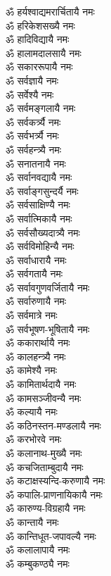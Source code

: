 \begin{multicols}{2}
\begin{flushleft}
ॐ हर्यश्वाद्यमरार्चितायै नमः\\
ॐ हरिकेशसख्यै नमः\\
ॐ हादिविद्यायै नमः\\
ॐ हालामदालसायै नमः\hfill {}\\
ॐ सकाररूपायै नमः\\
ॐ सर्वज्ञायै नमः\\
ॐ सर्वेश्यै नमः\\
ॐ सर्वमङ्गलायै नमः\\
ॐ सर्वकर्त्र्यै नमः\\
ॐ सर्वभर्त्र्यै नमः\\
ॐ सर्वहन्त्र्यै नमः\\
ॐ सनातनायै नमः\\
ॐ सर्वानवद्यायै नमः\\
ॐ सर्वाङ्गसुन्दर्यै नमः\hfill {}\\
ॐ सर्वसाक्षिण्यै नमः\\
ॐ सर्वात्मिकायै नमः\\
ॐ सर्वसौख्यदात्र्यै नमः\\
ॐ सर्वविमोहिन्यै नमः\\
ॐ सर्वाधारायै नमः\\
ॐ सर्वगतायै नमः\\
ॐ सर्वावगुणवर्जितायै नमः\\
ॐ सर्वारुणायै नमः\\
ॐ सर्वमात्रे नमः\\
ॐ सर्वभूषण-भूषितायै नमः\hfill {}\\
ॐ ककारार्थायै नमः\\
ॐ कालहन्त्र्यै नमः\\
ॐ कामेश्यै नमः\\
ॐ कामितार्थदायै नमः\\
ॐ कामसञ्जीवन्यै नमः\\
ॐ कल्यायै नमः\\
ॐ कठिनस्तन-मण्डलायै नमः\\
ॐ करभोरवे नमः\\
ॐ कलानाथ-मुख्यै नमः\\
ॐ कचजिताम्बुदायै नमः\hfill {}\\
ॐ कटाक्षस्यन्दि-करुणायै नमः\\
ॐ कपालि-प्राणनायिकायै नमः\\
ॐ कारुण्य-विग्रहायै नमः\\
ॐ कान्तायै नमः\\
ॐ कान्तिधूत-जपावल्यै नमः\\
ॐ कलालापायै नमः\\
ॐ कम्बुकण्ठ्यै नमः\\

\end{flushleft}
\end{multicols}
